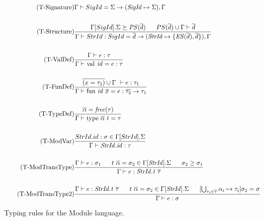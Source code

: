 \begin{figure}[htbp]
\begin{align*}
\tag{T-Signature}
&\Gamma \vdash SigId = \Sigma \rightarrow (\mathit{SigId} \mapsto \Sigma),\Gamma
\\
\\
\tag{T-Structure}
&\frac
{\Gamma[SigId].\Sigma \succeq \mathit{PS}(\overline{d}) \longspace PS(\overline{d}) \cup \Gamma \vdash \overline{d}}
{\Gamma \vdash StrId : SigId = \overline{d} \rightarrow (\mathit{StrId} \mapsto \lbrace \mathit{ES}(\overline{d}), \overline{d}\rbrace),\Gamma}
\\
\\
\tag{T-ValDef}
&\frac
{\Gamma \vdash e:\tau}
{\Gamma \vdash \text{\lsttext{val}}\ \mathit{id} = e:\tau}
\\
\\
\tag{T-FunDef}
&\frac
{\overline{(x = \tau_{2})} \cup \Gamma\ \vdash e:\tau_{1}}
{\Gamma \vdash \text{\lsttext{fun}}\ \mathit{id}\ \overline{x}= e:\overline{\tau_{2}} \rightarrow \tau_{1}}
\\
\\
\tag{T-TypeDef}
&\frac
{\overline{\alpha} = \mathit{free(\tau)}}
{\Gamma \vdash \text{\lsttext{type}}\ \overline{\alpha}\ t = \tau}
\\
\\
\tag{T-ModVar}
&\frac
{StrId.id:\sigma \in \Gamma[StrId].\Sigma}
{\Gamma \vdash \mathit{StrId.id} : \tau}
\\
\\
\tag{T-ModTransType}
&\frac
{\Gamma \vdash e:\sigma_{1} \longspace t\ \overline{\alpha} = \sigma_{2} \in \Gamma[\mathit{StrId}].\Sigma \longspace \sigma_{2} \geq \sigma_{1}}
{\Gamma \vdash e : \mathit{StrId.t}\ \overline{\tau}}
\\
\\
\tag{T-ModTransType2}
&\frac
{\Gamma \vdash e:\mathit{StrId.t}\ \overline{\tau} \longspace t\ \overline{\alpha} = \sigma_{2} \in \Gamma[\mathit{StrId}].\Sigma \longspace [\bigcup_{\tau_{i} \in \overline{\tau}} \alpha_{i} \mapsto \tau_{i}]\sigma_{2} = \sigma}
{\Gamma \vdash e:\sigma}
\end{align*}
\caption[Typing Rules: Module Language]{Typing rules for the Module language. \label{fig:TypeRulesModule}}
\end{figure}


